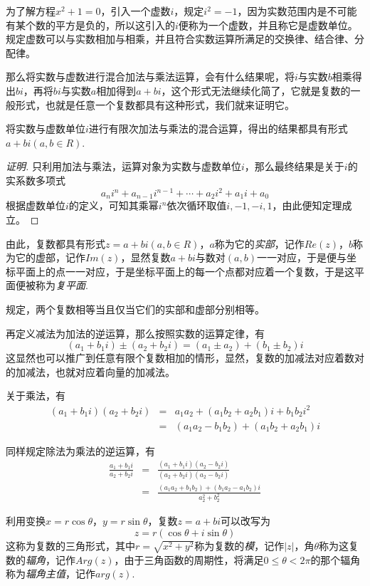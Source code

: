 为了解方程$x^2+1=0$，引入一个虚数$i$，规定$i^2=-1$，因为实数范围内是不可能有某个数的平方是负的，所以这引入的$i$便称为一个虚数，并且称它是虚数单位。规定虚数可以与实数相加与相乘，并且符合实数运算所满足的交换律、结合律、分配律。

那么将实数与虚数进行混合加法与乘法运算，会有什么结果呢，将$i$与实数$b$相乘得出$bi$，再将$bi$与实数$a$相加得到$a+bi$，这个形式无法继续化简了，它就是复数的一般形式，也就是任意一个复数都具有这种形式，我们就来证明它。

\begin{theorem}
  将实数与虚数单位$i$进行有限次加法与乘法的混合运算，得出的结果都具有形式$a+bi(a,b\in R)$.
\end{theorem}

\begin{proof}[证明]
  只利用加法与乘法，运算对象为实数与虚数单位$i$，那么最终结果是关于$i$的实系数多项式
  \[ a_ni^n+a_{n-1}i^{n-1} + \cdots + a_2i^2 + a_1i+a_0 \]
  根据虚数单位$i$的定义，可知其乘幂$i^n$依次循环取值$i,-1,-i,1$，由此便知定理成立。
\end{proof}

由此，复数都具有形式$z=a+bi(a,b\in R)$，$a$称为它的\emph{实部}，记作$Re(z)$，$b$称为它的虚部，记作$Im(z)$，显然复数$a+bi$与数对$(a,b)$一一对应，于是便与坐标平面上的点一一对应，于是坐标平面上的每一个点都对应着一个复数，于是这平面便被称为\emph{复平面}.

规定，两个复数相等当且仅当它们的实部和虚部分别相等。

再定义减法为加法的逆运算，那么按照实数的运算定律，有
\[ (a_1+b_1i) \pm (a_2+b_2i) = (a_1 \pm a_2) + (b_1 \pm b_2)i \]
这显然也可以推广到任意有限个复数相加的情形，显然，复数的加减法对应着数对的加减法，也就对应着向量的加减法。

关于乘法，有
\begin{eqnarray*}
  (a_1+b_1i)(a_2+b_2i) & = & a_1a_2+(a_1b_2+a_2b_1)i + b_1b_2 i^2 \\
  & = & (a_1a_2-b_1b_2) + (a_1b_2+a_2b_1)i
\end{eqnarray*}

同样规定除法为乘法的逆运算，有
\begin{eqnarray*}
  \frac{a_1+b_1i}{a_2+b_2i} & = & \frac{(a_1+b_1i)(a_2-b_2i)}{(a_2+b_2i)(a_2-b_2i)} \\
  & = & \frac{(a_1a_2+b_1b_2)+(b_1a_2-a_1b_2)i}{a_2^2+b_2^2}
\end{eqnarray*}

利用变换$x=r\cos{\theta}$，$y=r\sin{\theta}$，复数$z=a+bi$可以改写为
\[ z=r(\cos{\theta}+i\sin{\theta}) \]
这称为复数的三角形式，其中$r=\sqrt{x^2+y^2}$称为复数的\emph{模}，记作$|z|$，角$\theta$称为这复数的\emph{辐角}，记作$Arg(z)$，由于三角函数的周期性，将满足$0\leqslant \theta < 2\pi$的那个辐角称为\emph{辐角主值}，记作$arg(z)$.

